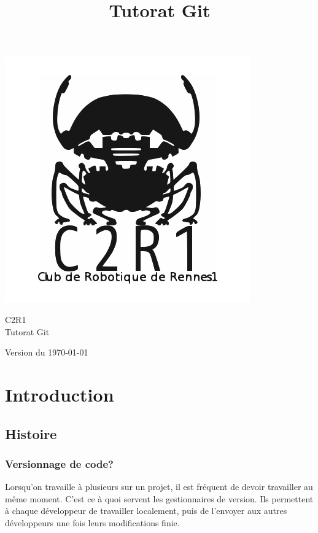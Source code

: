 \documentclass[a4paper,10pt]{report}
\title{Tutorat Git}
\begin{document}
\renewcommand{\chaptername}{Partie}

\begin{titlepage}
\vspace{-3cm}\hspace{-2cm}\includegraphics[scale=0.4]{C2R1}
\begin{center}
\vspace{2cm}
{\selectfont
\Large{C2R1}\\
\vspace{0.5cm}
\Huge{Tutorat Git}}\\
\end{center}
\begin{flushright}
 \vfill
{\selectfont
\large{Version du \today}}
\end{flushright}
\end{titlepage}

\pagestyle{fancy}

\tableofcontents
\newpage

\chapter{Introduction}
  \section{Histoire}
    \subsection{Versionnage de code?}
Lorsqu'on travaille \`a plusieurs sur un projet, il est fr\'equent de devoir travailler au m\^eme moment. C'est ce \`a quoi servent les gestionnaires de version. Ils permettent \`a chaque d\'eveloppeur de travailler localement, puis de l'envoyer aux autres d\'eveloppeurs une fois leurs modifications finie.
\end{document}
